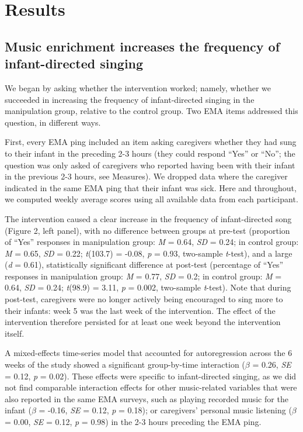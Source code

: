 \documentclass[
]{article}
\begin{document}
\section{Results}\label{results}

\subsection{Music enrichment increases the frequency of infant-directed
singing}\label{music-enrichment-increases-the-frequency-of-infant-directed-singing}

We began by asking whether the intervention worked; namely, whether we
succeeded in increasing the frequency of infant-directed singing in the
manipulation group, relative to the control group. Two EMA items
addressed this question, in different ways.

First, every EMA ping included an item asking caregivers whether they
had sung to their infant in the preceding 2-3 hours (they could respond
``Yes'' or ``No''; the question was only asked of caregivers who
reported having been with their infant in the previous 2-3 hours, see
Measures). We dropped data where the caregiver indicated in the same EMA
ping that their infant was sick. Here and throughout, we computed weekly
average scores using all available data from each participant.

The intervention caused a clear increase in the frequency of
infant-directed song (Figure 2, left panel), with no difference between
groups at pre-test (proportion of ``Yes'' responses in manipulation
group: \emph{M} = 0.64, \emph{SD} = 0.24; in control group: \emph{M} =
0.65, \emph{SD} = 0.22; \emph{t}(103.7) = -0.08, \emph{p} = 0.93,
two-sample \emph{t}-test), and a large (\emph{d} = 0.61), statistically
significant difference at post-test (percentage of ``Yes'' responses in
manipulation group: \emph{M} = 0.77, \emph{SD} = 0.2; in control group:
\emph{M} = 0.64, \emph{SD} = 0.24; \emph{t}(98.9) = 3.11, \emph{p} =
0.002, two-sample \emph{t}-test). Note that during post-test, caregivers
were no longer actively being encouraged to sing more to their infants:
week 5 was the last week of the intervention. The effect of the
intervention therefore persisted for at least one week beyond the
intervention itself.

A mixed-effects time-series model that accounted for autoregression
across the 6 weeks of the study showed a significant group-by-time
interaction (\(\beta\) = 0.26, \emph{SE} = 0.12, \emph{p} = 0.02). These
effects were specific to infant-directed singing, as we did not find
comparable interaction effects for other music-related variables that
were also reported in the same EMA surveys, such as playing recorded
music for the infant (\(\beta\) = -0.16, \emph{SE} = 0.12, \emph{p} =
0.18); or caregivers' personal music listening (\(\beta\) = 0.00,
\emph{SE} = 0.12, \emph{p} = 0.98) in the 2-3 hours preceding the EMA
ping.
\end{document}
